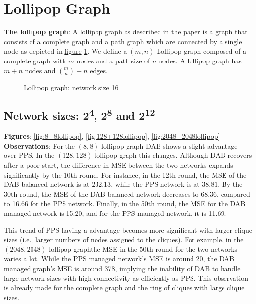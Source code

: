 \section{Lollipop Graph}
\textbf{The lollipop graph}: A lollipop graph as described in the paper \cite{JonassonLollipopGraphs2000} is a graph that consists of a complete graph and a path graph which are connected by a single node as depicted in \hyperref[fig:lollipopgraphDemo]{figure} \ref{fig:lollipopgraphDemo}. We define a $(m, n)$-Lollipop graph composed of a complete graph with $m$ nodes and a path size of $n$ nodes. A lollipop graph has $m+n$ nodes and $\binom{m}{n}+n$ edges.
\begin{figure}[H]
    \centering
    \scalebox{1}{}
    \caption{Lollipop graph: network size 16}
    \label{fig:lollipopgraphDemo}
\end{figure}

\subsection{Network sizes: 2\textsuperscript{4}, 2\textsuperscript{8} and 2\textsuperscript{12}}
\textbf{Figures}: \ref{fig:8+8lollipop}, \ref{fig:128+128lollipop}, \ref{fig:2048+2048lollipop}\\
\textbf{Observations}: For the $(8, 8)$-lollipop graph DAB shows a slight advantage over PPS. In the $(128, 128)$-lollipop graph this changes. Although DAB recovers after a poor start, the difference in MSE between the two networks expands significantly by the 10th round. For instance, in the 12th round, the MSE of the DAB balanced network is at $232.13$, while the PPS network is at $38.81$. By the 30th round, the MSE of the DAB balanced network decreases to 68.36, compared to 16.66 for the PPS network. Finally, in the 50th round, the MSE for the DAB managed network is 15.20, and for the PPS managed network, it is 11.69.

This trend of PPS having a advantage becomes more significant with larger clique sizes (i.e., larger numbers of nodes assigned to the cliques). For example, in the $(2048, 2048)$-lollipop graphthe MSE in the 50th round for the two networks varies a lot. While the PPS managed network's MSE is around 20, the DAB managed graph's MSE is around 378, implying the inability of DAB to handle large network sizes with high connectivity as efficiently as PPS. This observation is already made for the complete graph and the ring of cliques with large clique sizes. \\

